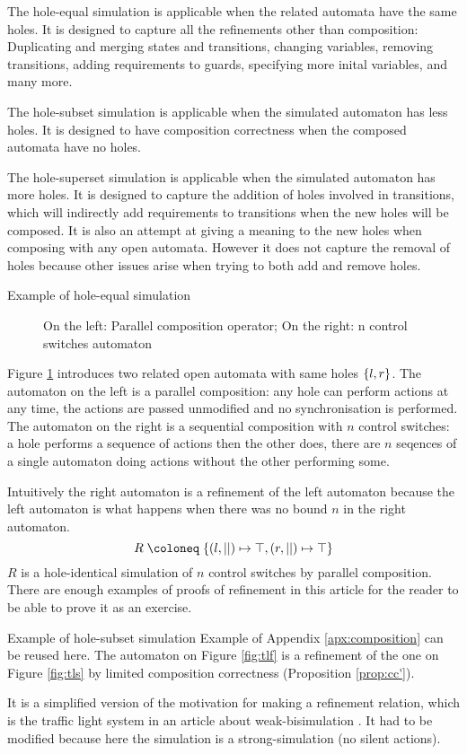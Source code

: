 \documentclass{article}
\begin{document}
The hole-equal simulation is applicable when the related automata have the same holes.
It is designed to capture all the refinements other than composition: Duplicating and merging states and transitions, changing variables, removing transitions, adding requirements to guards, specifying more inital variables, and many more.

The hole-subset simulation is applicable when the simulated automaton has less holes.
It is designed to have composition correctness when the composed automata have no holes.

The hole-superset simulation is applicable when the simulated automaton has more holes.
It is designed to capture the addition of holes involved in transitions, which will indirectly add requirements to transitions when the new holes will be composed.
It is also an attempt at giving a meaning to the new holes when composing with any open automata.
However it does not capture the removal of holes because other issues arise when trying to both add and remove holes.
\begin{exi}{Example of hole-equal simulation}
\begin{figure}
\centering

\vrule

\caption{On the left: Parallel composition operator; On the right: n control switches automaton}
\label{fig:hisim}
\end{figure}
Figure \ref{fig:hisim} introduces two related open automata with same holes \({\left\{l, r\right\}}\).
The automaton on the left is a parallel composition: any hole can perform actions at any time, the actions are passed unmodified and no synchronisation is performed.
The automaton on the right is a sequential composition with \(n\) control switches: a hole performs a sequence of actions then the other does, there are \(n\) seqences of a single automaton doing actions without the other performing some.

Intuitively the right automaton is a refinement of the left automaton because the left automaton is what happens when there was no bound \(n\) in the right automaton.
\[ R \defobject \mbrc{\mpar{l, ||} \mapsto \top, \mpar{r, ||} \mapsto \top} \]
\(R\) is a hole-identical simulation of \(n\) control switches by parallel composition.
There are enough examples of proofs of refinement in this article for the reader to be able to prove it as an exercise.
\end{exi}
\begin{exi}{Example of hole-subset simulation}
Example of Appendix \ref{apx:composition} can be reused here.
The automaton on Figure \ref{fig:tlf} is a refinement of the one on Figure \ref{fig:tls} by limited composition correctness (Proposition \ref{prop:cc'}).

It is a simplified version of the motivation for making a refinement relation, which is the traffic light system in an article about weak-bisimulation \cite{wang:03126313}.
It had to be modified because here the simulation is a strong-simulation (no silent actions).
\end{exi}
\end{document}
